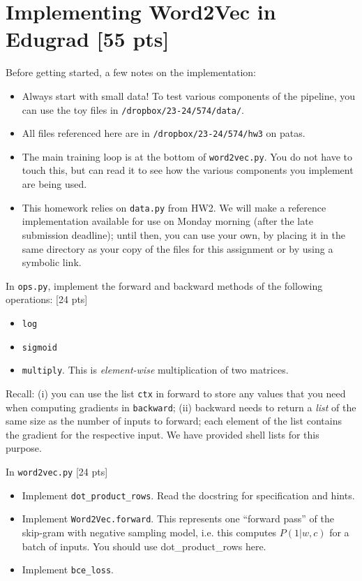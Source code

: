\documentclass[11pt]{article}
\begin{document}
\section{Implementing Word2Vec in Edugrad [55 pts]}

Before getting started, a few notes on the implementation:
\begin{itemize}
  \item Always start with small data!  To test various components of the pipeline, you can use the toy files in \texttt{/dropbox/23-24/574/data/}.
  \item All files referenced here are in \texttt{/dropbox/23-24/574/hw3} on patas.
  \item The main training loop is at the bottom of \texttt{word2vec.py}.  You do not have to touch this, but can read it to see how the various components you implement are being used.
  \item This homework relies on \texttt{data.py} from HW2. We will make a reference implementation available for use on Monday morning (after the late submission deadline); until then, you can use your own, by placing it in the same directory as your copy of the files for this assignment or by using a symbolic link.
\end{itemize}

\vspace{2em}
 In \texttt{ops.py}, implement the forward and backward methods of the following operations: [24 pts]
\begin{itemize}
  \item \texttt{log}
  \item \texttt{sigmoid}
  \item \texttt{multiply}.  This is \emph{element-wise} multiplication of two matrices.
\end{itemize}
Recall: (i) you can use the list \texttt{ctx} in forward to store any values that you need when computing gradients in \texttt{backward}; (ii) backward needs to return a \emph{list} of the same size as the number of inputs to forward; each element of the list contains the gradient for the respective input.  We have provided shell lists for this purpose.

\vspace{2em}
 In \texttt{word2vec.py} [24 pts]
\begin{itemize}
  \item Implement \texttt{dot\_product\_rows}.  Read the docstring for specification and hints.
  \item Implement \texttt{Word2Vec.forward}.  This represents one ``forward pass'' of the skip-gram with negative sampling model, i.e. this computes $P(1 | w, c)$ for a batch of inputs.  You should use dot\_product\_rows here.
  \item Implement \texttt{bce\_loss}.
\end{itemize}
\end{document}
